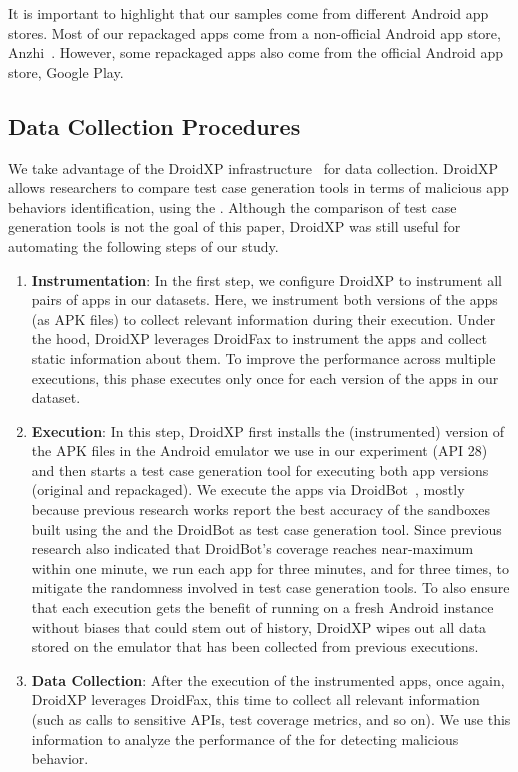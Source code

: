 It is important to highlight that our samples come from different Android app stores. Most of our repackaged apps come from a non-official
Android app store, Anzhi~\cite{anzhi}. However, some repackaged apps also come from the official Android app store, Google Play.


\subsection{Data Collection Procedures} \label{sec:dataCollectionProc}

We take advantage of the DroidXP infrastructure~\cite{DBLP:conf/scam/CostaMCMVBC20}
for data collection. DroidXP allows researchers to compare 
test case generation tools in terms of malicious app behaviors identification, using the \mas. Although the comparison of test
case generation tools is not the goal of this paper, DroidXP
was still useful for automating the following steps of our study.

\begin{enumerate}[S1]
 \item \textbf{Instrumentation}: In the first step,
we configure DroidXP to instrument all pairs of apps in our datasets.
Here, we instrument both versions of the apps (as APK files) to collect relevant information during their execution. Under the hood, DroidXP leverages
DroidFax to instrument the apps and collect static
information about them. To improve the performance across multiple executions,
this phase executes only once for each version of the apps in our dataset.

\item \textbf{Execution}: In this step, DroidXP first installs the (instrumented) version of the APK files in the Android emulator we use in our experiment (API 28) and then starts a test case generation tool for executing both app versions (original and repackaged). We execute the apps via DroidBot~\cite{DBLP:conf/icse/LiYGC17}, mostly because previous research works report the best accuracy of the sandboxes built using the \mas and the DroidBot as test case generation tool. Since previous research also indicated that DroidBot's coverage reaches near-maximum within one minute, we run each app for three minutes, and for three times, to mitigate the randomness involved in test case generation tools. To also ensure that each execution gets the benefit of running on a fresh Android instance without biases that could stem out of history, DroidXP wipes out all data stored on the emulator that has been collected from previous executions.


\item \textbf{Data Collection}: After the execution of the instrumented apps, once again, DroidXP leverages DroidFax, this time to collect all relevant information (such as calls to sensitive APIs, test coverage metrics, and so on). We use this information to analyze the performance of the \mas for detecting malicious behavior.
\end{enumerate}

